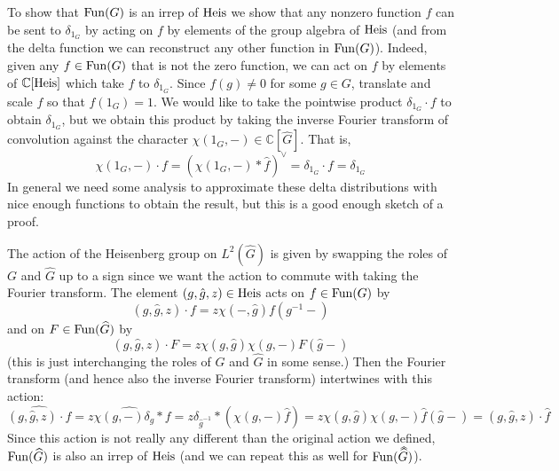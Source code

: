 \documentclass[../../rtnotes.tex]{subfiles}
\begin{document}
To show that $\operatorname{Fun}(G)$ is an irrep of $\operatorname{Heis}$ we show that any nonzero function $f$ can be sent to $\delta_{1_G}$ by acting on $f$ by elements of the group algebra of $\operatorname{Heis}$ (and from the delta function we can reconstruct any other function in $\operatorname{Fun}(G)$). Indeed, given any $f\in \operatorname{Fun}(G)$ that is not the zero function, we can act on $f$ by elements of $\mathbb C[\operatorname{Heis}]$ which take $f$ to $\delta_{1_G}$. Since $f(g) \neq 0$ for some $g\in G$, translate and scale $f$ so that $f(1_G) = 1$. We would like to take the pointwise product $\delta_{1_G}\cdot f$ to obtain $\delta_{1_G}$, but we obtain this product by taking the inverse Fourier transform of convolution against the character $\chi(1_G,-)\in\mathbb C[\widehat G]$. That is,
\[\chi(1_G,-)\cdot f = (\chi(1_G,-)\ast\hat f)^\vee = \delta_{1_G}\cdot f = \delta_{1_G}\]
In general we need some analysis to approximate these delta distributions with nice enough functions to obtain the result, but this is a good enough sketch of a proof.

The action of the Heisenberg group on $L^2(\widehat G)$ is given by swapping the roles of $G$ and $\widehat G$ up to a sign since we want the action to commute with taking the Fourier transform. The element $(g,\hat g, z)\in \operatorname{Heis}$ acts on $f\in \operatorname{Fun}(G)$ by
\[(g,\hat g, z)\cdot f = z\chi(-,\hat g)f(g^{-1}-)\]
and on $F\in \operatorname{Fun}(\widehat G)$ by 
\[(g,\hat g, z)\cdot F = z\chi(g,\hat g)\chi(g,-)F(\hat g-)\]
(this is just interchanging the roles of $G$ and $\widehat G$ in some sense.) Then the Fourier transform (and hence also the inverse Fourier transform) intertwines with this action:
\[\widehat{(g,\hat g,z)\cdot f} = \widehat{z\chi(g,-)\delta_g\ast f} = z\delta_{\hat g^{-1}}\ast(\chi(g,-)\hat f) = z\chi(g,\hat g)\chi(g,-)\hat f(\hat g-) = (g,\hat g, z)\cdot \hat f\]
Since this action is not really any different than the original action we defined, $\operatorname{Fun}(\widehat G)$ is also an irrep of $\operatorname{Heis}$ (and we can repeat this as well for $\Fun(\dwidehat G)$).
\end{document}
